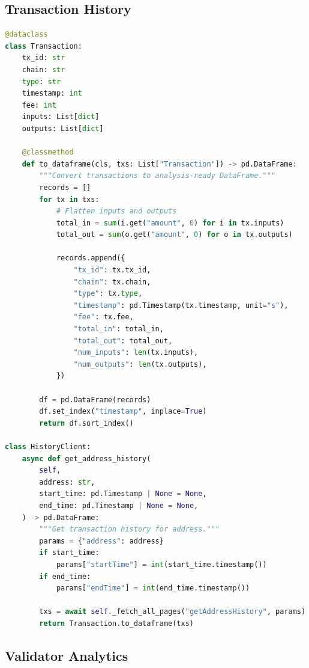 \documentclass[11pt,twocolumn]{article}
\begin{document}
\subsection{Transaction History}

\begin{lstlisting}[language=Python,caption=Transaction DataFrame]
@dataclass
class Transaction:
    tx_id: str
    chain: str
    type: str
    timestamp: int
    fee: int
    inputs: List[dict]
    outputs: List[dict]

    @classmethod
    def to_dataframe(cls, txs: List["Transaction"]) -> pd.DataFrame:
        """Convert transactions to analysis-ready DataFrame."""
        records = []
        for tx in txs:
            # Flatten inputs and outputs
            total_in = sum(i.get("amount", 0) for i in tx.inputs)
            total_out = sum(o.get("amount", 0) for o in tx.outputs)

            records.append({
                "tx_id": tx.tx_id,
                "chain": tx.chain,
                "type": tx.type,
                "timestamp": pd.Timestamp(tx.timestamp, unit="s"),
                "fee": tx.fee,
                "total_in": total_in,
                "total_out": total_out,
                "num_inputs": len(tx.inputs),
                "num_outputs": len(tx.outputs),
            })

        df = pd.DataFrame(records)
        df.set_index("timestamp", inplace=True)
        return df.sort_index()

class HistoryClient:
    async def get_address_history(
        self,
        address: str,
        start_time: pd.Timestamp | None = None,
        end_time: pd.Timestamp | None = None,
    ) -> pd.DataFrame:
        """Get transaction history for address."""
        params = {"address": address}
        if start_time:
            params["startTime"] = int(start_time.timestamp())
        if end_time:
            params["endTime"] = int(end_time.timestamp())

        txs = await self._fetch_all_pages("getAddressHistory", params)
        return Transaction.to_dataframe(txs)
\end{lstlisting}

\subsection{Validator Analytics}
\end{document}

